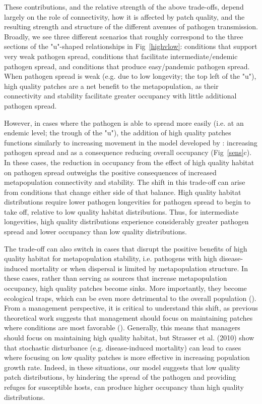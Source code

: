 \documentclass{svjour3}
\begin{document}
These contributions, and the relative strength of the above trade-offs, depend largely on the role of connectivity, how it is affected by patch quality, and the resulting strength and structure of the different avenues of pathogen transmission.  Broadly, we see three different scenarios that roughly correspond to the three sections of the "u"-shaped relationships in Fig~\ref{highvlow}: conditions that support very weak pathogen spread, conditions that facilitate intermediate/endemic pathogen spread, and conditions that produce easy/pandemic pathogen spread.  When pathogen spread is weak (e.g. due to low longevity; the top left of the "u"), high quality patches are a net benefit to the metapopulation, as their connectivity and stability facilitate greater occupancy with little additional pathogen spread.  

However, in cases where the pathogen is able to spread more easily (i.e. at an endemic level; the trough of the "u"), the addition of high quality patches functions similarly to increasing movement in the model developed by \cite{Hess1996}: increasing pathogen spread and as a consequence reducing overall occupancy (Fig~\ref{sens}c).  In these cases, the reduction in occupancy from the effect of high quality habitat on pathogen spread outweighs the positive consequences of increased metapopulation connectivity and stability.  The shift in this trade-off can arise from conditions that change either side of that balance.  High quality habitat distributions require lower pathogen longevities for pathogen spread to begin to take off, relative to low quality habitat distributions.  Thus, for intermediate longevities, high quality distributions experience considerably greater pathogen spread and lower occupancy than low quality distributions.

The trade-off can also switch in cases that disrupt the positive benefits of high quality habitat for metapopulation stability, i.e. pathogens with high disease-induced mortality or when dispersal is limited by metapopulation structure.  In these cases, rather than serving as sources that increase metapopulation occupancy, high quality patches become sinks.  More importantly, they become ecological traps, which can be even more detrimental to the overall population (\cite{Kristan2003}).  From a management perspective, it is critical to understand this shift, as previous theoretical work suggests that management should focus on maintaining patches where conditions are most favorable (\cite{Strasser2010}).  Generally, this means that managers should focus on maintaining high quality habitat, but Strasser et al. (2010) show that stochastic disturbance (e.g. disease-induced mortality) can lead to cases where focusing on low quality patches is more effective in increasing population growth rate.  Indeed, in these situations, our model suggests that low quality patch distributions, by hindering the spread of the pathogen and providing refuges for susceptible hosts, can produce higher occupancy than high quality distributions.  
\end{document}
